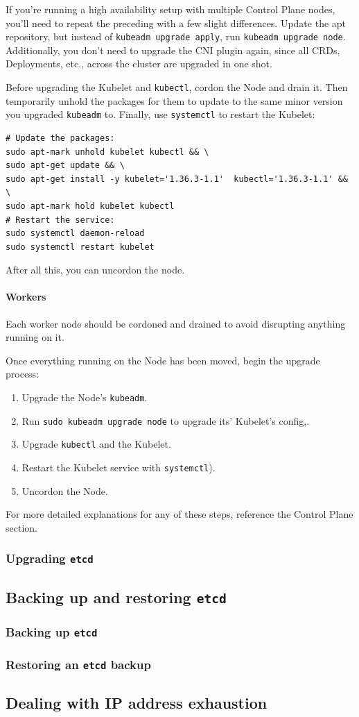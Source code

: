 \documentclass[11pt, a4paper]{article}
\begin{document}
If you're running a high availability setup with multiple Control Plane nodes, you'll need to repeat the preceding with a few slight differences. Update the apt repository, but instead of \texttt{kubeadm upgrade apply}, run \texttt{kubeadm upgrade node}. Additionally, you don't need to upgrade the CNI plugin again, since all CRDs, Deployments, etc., across the cluster are upgraded in one shot.

Before upgrading the Kubelet and \texttt{kubectl}, cordon the Node and drain it. Then temporarily unhold the packages for them to update to the same minor version you upgraded \texttt{kubeadm} to. Finally, use \texttt{systemctl} to restart the Kubelet:

\begin{lstlisting}
# Update the packages:
sudo apt-mark unhold kubelet kubectl && \
sudo apt-get update && \
sudo apt-get install -y kubelet='1.36.3-1.1'  kubectl='1.36.3-1.1' && \
sudo apt-mark hold kubelet kubectl
# Restart the service:
sudo systemctl daemon-reload
sudo systemctl restart kubelet
\end{lstlisting}

After all this, you can uncordon the node.

\paragraph{Workers}\mbox{}

Each worker node should be cordoned and drained to avoid disrupting anything running on it.

Once everything running on the Node has been moved, begin the upgrade process: 

\begin{enumerate}
\item Upgrade the Node's \texttt{kubeadm}.
\item Run \texttt{sudo kubeadm upgrade node} to upgrade its' Kubelet's config,.
\item Upgrade \texttt{kubectl} and the Kubelet.
\item Restart the Kubelet service with \texttt{systemctl}).
\item Uncordon the Node.
\end{enumerate}

For more detailed explanations for any of these steps, reference the Control Plane section.

\subsubsection{Upgrading \texttt{etcd}}

\subsection{Backing up and restoring \texttt{etcd}}

\subsubsection{Backing up \texttt{etcd}}

\subsubsection{Restoring an \texttt{etcd} backup}

\subsection{Dealing with IP address exhaustion}
\end{document}
